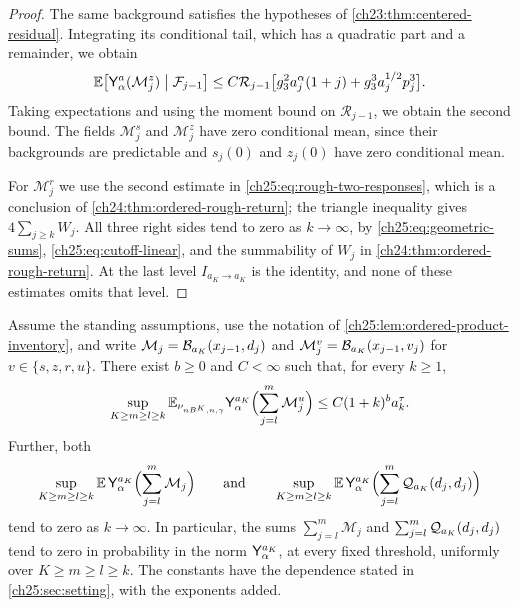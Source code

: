 \begin{proof}
The same background satisfies the hypotheses of \cref{ch23:thm:centered-residual}. Integrating its conditional tail, which has a quadratic part and a remainder, we obtain
\[
 \mathbb E\bigl[\mathsf Y_{\alpha}^{a}(\mathcal M_j^z)\bigm|\mathcal F_{j-1}\bigr]\le C\mathcal R_{j-1}\bigl[g_3^2a_j^\alpha(1+j)+g_3^3a_j^{1/2}p_j^3\bigr].
\]
Taking expectations and using the moment bound on $\mathcal R_{j-1}$, we obtain the second bound. The fields $\mathcal M_j^s$ and $\mathcal M_j^z$ have zero conditional mean, since their backgrounds are predictable and $s_j(0)$ and $z_j(0)$ have zero conditional mean.

For $\mathcal M_j^r$ we use the second estimate in \eqref{ch25:eq:rough-two-responses}, which is a conclusion of \cref{ch24:thm:ordered-rough-return}; the triangle inequality gives $4\sum_{j\ge k}W_j$. All three right sides tend to zero as $k\to\infty$, by \eqref{ch25:eq:geometric-sums}, \eqref{ch25:eq:cutoff-linear}, and the summability of $W_j$ in \cref{ch24:thm:ordered-rough-return}. At the last level $I_{a_K\to a_K}$ is the identity, and none of these estimates omits that level.
\end{proof}

\begin{theorem}\label{ch25:thm:both-enhanced-tails}
Assume the standing assumptions, use the notation of \cref{ch25:lem:ordered-product-inventory}, and write $\mathcal M_j=\mathcal B_{a_K}(x_{j-1},d_j)$ and $\mathcal M_j^v=\mathcal B_{a_K}(x_{j-1},v_j)$ for $v\in\{s,z,r,u\}$. There exist $b\ge0$ and $C<\infty$ such that, for every $k\ge1$,
\[
 \sup_{K\ge m\ge l\ge k}\mathbb E_{\nu_{nB^K,n,\gamma}}\mathsf Y_{\alpha}^{a_K}\Bigl(\sum_{j=l}^m\mathcal M_j^u\Bigr)\le C(1+k)^ba_k^\tau.
\]
Further, both
\[
 \sup_{K\ge m\ge l\ge k}\mathbb E\,\mathsf Y_{\alpha}^{a_K}\Bigl(\sum_{j=l}^m\mathcal M_j\Bigr)\qquad\text{and}\qquad
 \sup_{K\ge m\ge l\ge k}\mathbb E\,\mathsf Y_{\alpha}^{a_K}\Bigl(\sum_{j=l}^m\mathcal Q_{a_K}(d_j,d_j)\Bigr)
\]
tend to zero as $k\to\infty$. In particular, the sums $\sum_{j=l}^m\mathcal M_j$ and $\sum_{j=l}^m\mathcal Q_{a_K}(d_j,d_j)$ tend to zero in probability in the norm $\mathsf Y_{\alpha}^{a_K}$, at every fixed threshold, uniformly over $K\ge m\ge l\ge k$. The constants have the dependence stated in \cref{ch25:sec:setting}, with the exponents added.
\end{theorem}

